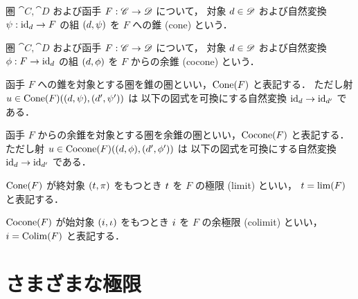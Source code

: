 \documentclass[titlepage]{ltjsreport}
\newtheorem[S]{theorem}{定理}[chapter]
\newtheorem[S]{definition}[theorem]{定義}
\newtheorem[S]{example}[theorem]{例}
\begin{document}
\begin{definition}[錐]
  圏 $\cat{C},\cat{D}$ および函手 ${F}:{\mathscr{C}}\to{\mathscr{D}}$ について，
  対象 $\obj{d}\in\objs{\cat{D}}$ および自然変換 $\mrp{\psi}{\id{\obj{d}}}{F}$
  の組 $(\obj{d},\psi)$ を $F$ への錐 (cone) という．
\end{definition}

\begin{definition}[余錐]
  圏 $\cat{C},\cat{D}$ および函手 ${F}:{\mathscr{C}}\to{\mathscr{D}}$ について，
  対象 $\obj{d}\in\objs{\cat{D}}$ および自然変換 $\mrp{\phi}{F}{\id{\obj{d}}}$
  の組 $(\obj{d},\phi)$ を $F$ からの余錐 (cocone) という．
\end{definition}

\begin{definition}[錐の圏]
  函手 $F$ への錐を対象とする圏を錐の圏といい，$\operatorname{Cone}(F)$ と表記する．
  ただし射 $u\in\mrps{\cone(F)}{(\obj{d},\psi)}{(\obj{d'},\psi')}$ は
  以下の図式を可換にする自然変換 $\id{\obj{d}}\to\id{\obj{d'}}$ である．
  \begin{center}
    
  \end{center}
\end{definition}

\begin{definition}[余錐の圏]
  函手 $F$ からの余錐を対象とする圏を余錐の圏といい，$\operatorname{Cocone}(F)$ と表記する．
  ただし射 $u\in\operatorname{Cocone}(F)((d,\phi),(d',\phi'))$ は
  以下の図式を可換にする自然変換 $\mathrm{id}_{d}\to\mathrm{id}_{d'}$ である．
  \begin{center}
    
  \end{center}
\end{definition}

\begin{definition}[極限]
  $\operatorname{Cone}(F)$ が終対象 $(\obj{t},\pi)$ をもつとき
  $\obj{t}$ を $F$ の極限 (limit) といい，
  $\obj{t}=\lim(F)$ と表記する．
\end{definition}

\begin{definition}[余極限]
  $\operatorname{Cocone}(F)$ が始対象 $(\obj{i},\iota)$ をもつとき
  $\obj{i}$ を $F$ の余極限 (colimit) といい，
  $\obj{i}=\colim(F)$ と表記する．
\end{definition}

\section{さまざまな極限}
\end{document}
